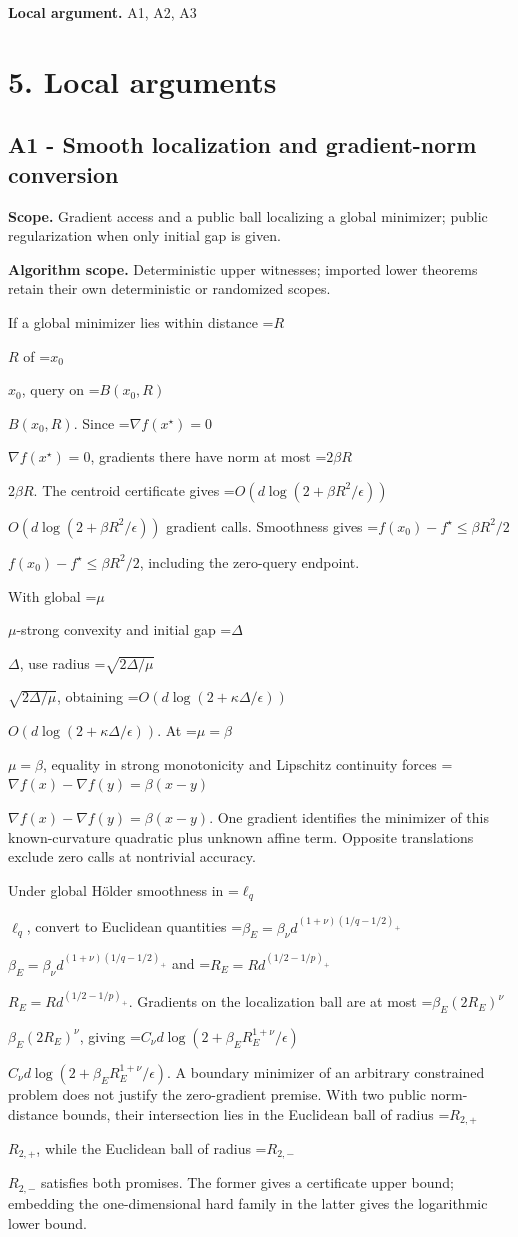 \documentclass[10pt,a4paper]{article}
\newcommand{\AtlasMath}[1]{\par\begingroup\centering\setbox0=\hbox{$\displaystyle #1$}\ifdim\wd0>1.4\linewidth\typeout{ATLAS WIDE FORMULA: \the\wd0}\fi\ifdim\wd0>\linewidth\resizebox{\linewidth}{!}{\box0}\else\box0\fi\par\endgroup}
\newcommand{\AtlasInlineMath}[1]{\begingroup\setbox0=\hbox{$#1$}\ifdim\wd0>.4\linewidth\endgroup\AtlasMath{#1}\else\endgroup$#1$\fi}
\begin{document}
\textbf{Local argument.} A1, A2, A3

\section{5. Local arguments}
\subsection{A1 - Smooth localization and gradient-norm conversion}
\textbf{Scope.} Gradient access and a public ball localizing a global minimizer; public regularization when only initial gap is given.

\textbf{Algorithm scope.} Deterministic upper witnesses; imported lower theorems retain their own deterministic or randomized scopes.

If a global minimizer lies within distance \AtlasInlineMath{R} of \AtlasInlineMath{x_0}, query on \AtlasInlineMath{B(x_0,R)}. Since \AtlasInlineMath{\nabla f(x^\star)=0}, gradients there have norm at most \AtlasInlineMath{2\beta R}. The centroid certificate gives \AtlasInlineMath{O(d\log(2+\beta R^2/\epsilon))} gradient calls. Smoothness gives \AtlasInlineMath{f(x_0)-f^\star\le\beta R^2/2}, including the zero-query endpoint.

With global \AtlasInlineMath{\mu}-strong convexity and initial gap \AtlasInlineMath{\Delta}, use radius \AtlasInlineMath{\sqrt{2\Delta/\mu}}, obtaining \AtlasInlineMath{O(d\log(2+\kappa\Delta/\epsilon))}. At \AtlasInlineMath{\mu=\beta}, equality in strong monotonicity and Lipschitz continuity forces \AtlasInlineMath{\nabla f(x)-\nabla f(y)=\beta(x-y)}. One gradient identifies the minimizer of this known-curvature quadratic plus unknown affine term. Opposite translations exclude zero calls at nontrivial accuracy.

Under global Hölder smoothness in \AtlasInlineMath{\ell_q}, convert to Euclidean quantities
\AtlasInlineMath{\beta_E=\beta_\nu d^{(1+\nu)(1/q-1/2)_+}} and
\AtlasInlineMath{R_E=Rd^{(1/2-1/p)_+}}. Gradients on the localization ball are at most \AtlasInlineMath{\beta_E(2R_E)^\nu}, giving
\AtlasInlineMath{C_\nu d\log(2+\beta_E R_E^{1+\nu}/\epsilon)}.
A boundary minimizer of an arbitrary constrained problem does not justify the zero-gradient premise. With two public norm-distance bounds, their intersection lies in the Euclidean ball of radius \AtlasInlineMath{R_{2,+}}, while the Euclidean ball of radius \AtlasInlineMath{R_{2,-}} satisfies both promises. The former gives a certificate upper bound; embedding the one-dimensional hard family in the latter gives the logarithmic lower bound.
\end{document}
